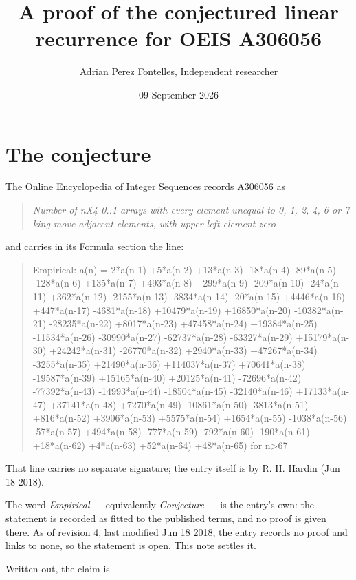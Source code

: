 \documentclass[11pt]{article}
\title{A proof of the conjectured linear recurrence for OEIS A306056}
\author{Adrian Perez Fontelles, Independent researcher}
\date{09 September 2026}
\theoremstyle{definition}
\begin{document}
\maketitle
\section{The conjecture}

The Online Encyclopedia of Integer Sequences records \href{https://oeis.org/A306056}{A306056} as

\begin{quote}\itshape Number of nX4 0..1 arrays with every element unequal to 0, 1, 2, 4, 6 or 7 king-move adjacent elements, with upper left element zero\end{quote}

and carries in its Formula section the line:

\begin{quote}\ttfamily Empirical: a(n) = 2*a(n-1) +5*a(n-2) +13*a(n-3) -18*a(n-4) -89*a(n-5) -128*a(n-6) +135*a(n-7) +493*a(n-8) +299*a(n-9) -209*a(n-10) -24*a(n-11) +362*a(n-12) -2155*a(n-13) -3834*a(n-14) -20*a(n-15) +4446*a(n-16) +447*a(n-17) -4681*a(n-18) +10479*a(n-19) +16850*a(n-20) -10382*a(n-21) -28235*a(n-22) +8017*a(n-23) +47458*a(n-24) +19384*a(n-25) -11534*a(n-26) -30990*a(n-27) -62737*a(n-28) -63327*a(n-29) +15179*a(n-30) +24242*a(n-31) -26770*a(n-32) +2940*a(n-33) +47267*a(n-34) -3255*a(n-35) +21490*a(n-36) +114037*a(n-37) +70641*a(n-38) -19587*a(n-39) +15165*a(n-40) +20125*a(n-41) -72696*a(n-42) -77392*a(n-43) -14993*a(n-44) -18504*a(n-45) -32140*a(n-46) +17133*a(n-47) +37141*a(n-48) +7270*a(n-49) -10861*a(n-50) -3813*a(n-51) +816*a(n-52) +3906*a(n-53) +5575*a(n-54) +1654*a(n-55) -1038*a(n-56) -57*a(n-57) +494*a(n-58) -777*a(n-59) -792*a(n-60) -190*a(n-61) +18*a(n-62) +4*a(n-63) +52*a(n-64) +48*a(n-65) for n>67\end{quote}

That line carries no separate signature; the entry itself is by R. H. Hardin (Jun 18 2018).

The word {\itshape Empirical} --- equivalently {\itshape Conjecture} --- is the entry's own: the statement is recorded as fitted to the published terms, and no proof is given there. As of revision 4, last modified Jun 18 2018, the entry records no proof and links to none, so the statement is open. This note settles it.

Written out, the claim is
\end{document}
